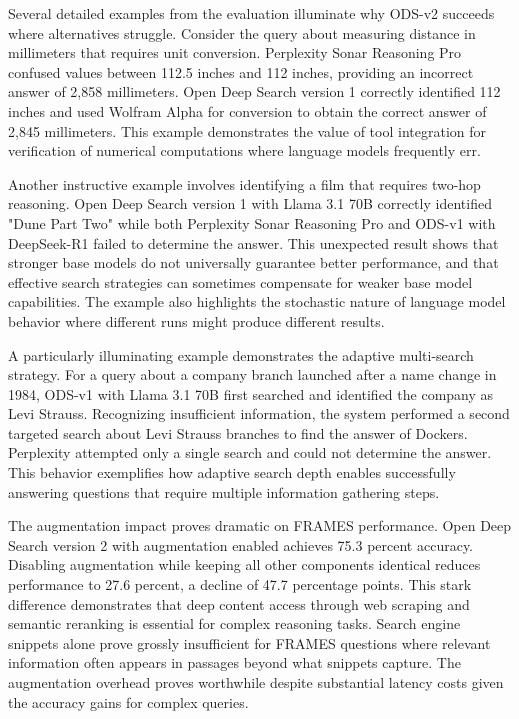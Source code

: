 Several detailed examples from the evaluation illuminate why ODS-v2 succeeds where alternatives struggle. Consider the query about measuring distance in millimeters that requires unit conversion. Perplexity Sonar Reasoning Pro confused values between 112.5 inches and 112 inches, providing an incorrect answer of 2,858 millimeters. Open Deep Search version 1 correctly identified 112 inches and used Wolfram Alpha for conversion to obtain the correct answer of 2,845 millimeters. This example demonstrates the value of tool integration for verification of numerical computations where language models frequently err.

Another instructive example involves identifying a film that requires two-hop reasoning. Open Deep Search version 1 with Llama 3.1 70B correctly identified "Dune Part Two" while both Perplexity Sonar Reasoning Pro and ODS-v1 with DeepSeek-R1 failed to determine the answer. This unexpected result shows that stronger base models do not universally guarantee better performance, and that effective search strategies can sometimes compensate for weaker base model capabilities. The example also highlights the stochastic nature of language model behavior where different runs might produce different results.

A particularly illuminating example demonstrates the adaptive multi-search strategy. For a query about a company branch launched after a name change in 1984, ODS-v1 with Llama 3.1 70B first searched and identified the company as Levi Strauss. Recognizing insufficient information, the system performed a second targeted search about Levi Strauss branches to find the answer of Dockers. Perplexity attempted only a single search and could not determine the answer. This behavior exemplifies how adaptive search depth enables successfully answering questions that require multiple information gathering steps.

The augmentation impact proves dramatic on FRAMES performance. Open Deep Search version 2 with augmentation enabled achieves 75.3 percent accuracy. Disabling augmentation while keeping all other components identical reduces performance to 27.6 percent, a decline of 47.7 percentage points. This stark difference demonstrates that deep content access through web scraping and semantic reranking is essential for complex reasoning tasks. Search engine snippets alone prove grossly insufficient for FRAMES questions where relevant information often appears in passages beyond what snippets capture. The augmentation overhead proves worthwhile despite substantial latency costs given the accuracy gains for complex queries.

